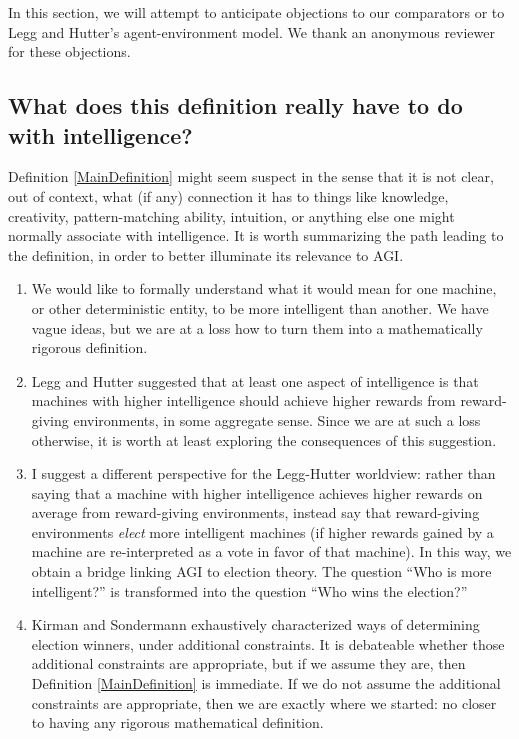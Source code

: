 \documentclass[twoside,11pt]{article}
\begin{document}
In this section, we will attempt to anticipate objections to our comparators or to
Legg and Hutter's agent-environment model. We thank an anonymous reviewer for
these objections.

\subsection{What does this definition really have to do with intelligence?}

Definition \ref{MainDefinition} might seem suspect in the sense that it is not
clear, out of context, what (if any) connection it has to things like knowledge,
creativity, pattern-matching ability, intuition, or anything else one might
normally associate with intelligence. It is worth summarizing the path leading to
the definition, in order to better illuminate its relevance to AGI.
\begin{enumerate}
    \item
    We would like to formally understand what it would mean for one machine, or
    other deterministic entity, to be more intelligent than another.
    We have vague ideas, but we are at a loss how
    to turn them into a mathematically rigorous definition.
    \item
    Legg and Hutter suggested that at least one aspect of intelligence is that
    machines with higher intelligence should achieve higher rewards from
    reward-giving environments, in some aggregate sense. Since we are at such
    a loss otherwise, it is worth at least exploring the consequences of this
    suggestion.
    \item
    I suggest a different perspective for the Legg-Hutter worldview: rather
    than saying that a machine with higher intelligence achieves higher rewards
    on average from reward-giving environments, instead say that reward-giving
    environments \emph{elect} more intelligent machines (if higher rewards gained
    by a machine are re-interpreted as a vote in favor of that machine). In this
    way, we obtain a bridge linking AGI to election theory. The question ``Who
    is more intelligent?'' is transformed into the question ``Who wins the election?''
    \item
    Kirman and Sondermann exhaustively characterized ways of determining election
    winners, under additional constraints. It is debateable whether those
    additional constraints are appropriate, but if we assume they are,
    then Definition \ref{MainDefinition} is immediate. If we do not assume
    the additional constraints are
    appropriate, then we are exactly where we started: no closer to having any
    rigorous mathematical definition.
\end{enumerate}
\end{document}
